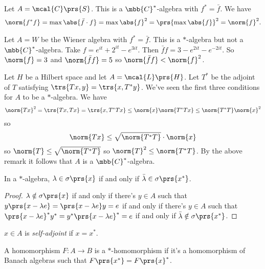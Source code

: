 \documentclass[10pt, twoside]{book}
\begin{document}
\begin{example}
Let $A = \mcal{C}\prs{S}$. This is a $\mbb{C}^*$-algebra with $f^* = \bar{f}$. We have
\begin{align*}
\norm{f^* f} = \max \abs{\bar{f} \cdot f} = \max \abs{f}^2 = \prs{\max \abs{f}}^2 = \norm{f}^2 \text{.}
\end{align*}
\end{example}

\begin{example}
Let $A = W$ be the Wiener algebra with $f^* = \bar{f}$. This is a $*$-algebra but not a $\mbb{C}^*$-algebra. Take $f = e^{it} + 2^{it} - e^{3 it}$. Then $\bar{f} f = 3 - e^{2 it} - e^{-2 it}$. So $\norm{f} = 3$ and $\norm{\bar{f} f} = 5$ so $\norm{\bar{f} f} < \norm{f}^2$.
\end{example}

\begin{example}
Let $H$ be a Hilbert space and let $A =\mcal{L}\prs{H}$. Let $T^*$ be the adjoint of $T$ satisfying $\trs{Tx, y} = \trs{x, T^* y}$. We've seen the first three conditions for $A$ to be a $*$-algebra. We have
\[\norm{Tx}^2 = \trs{Tx, Tx} = \trs{x, T^* T x} \leq \norm{x} \norm{T^* T x} \leq \norm{T^* T} \norm{x}^2\]
so
\[\norm{T x} \leq \sqrt{\norm{T^* T}} \cdot \norm{x}\]
so $\norm{T} \leq \sqrt{\norm{T^* T}}$
so
$\norm{T}^2 \leq \norm{T^* T}$.
By the above remark it follows that $A$ is a $\mbb{C}^*$-algebra.
\end{example}

\begin{proposition}
In a $*$-algebra, $\lambda \in \sigma\prs{x}$ if and only if $\bar{\lambda} \in \sigma\prs{x^*}$.
\end{proposition}

\begin{proof}
$\lambda \notin \sigma\prs{x}$ if and only if there's $y \in A$ such that $y\prs{x-\lambda e} = \prs{x-\lambda e} y = e$ if and only if there's $y \in A$ such that $\prs{x-\lambda e}^* y^*  = y^* \prs{x-\lambda e}^* = e$ if and only if $\bar{\lambda} \notin \sigma\prs{x^*}$.
\end{proof}

\begin{definition}
$x \in A$ is \emph{self-adjoint} if $x = x^*$.
\end{definition}

\begin{definition}[$*$-Homomorphism]
A homomorphism $F \colon A \to B$ is a $*$-homomorphism if it's a homomorphism of Banach algebras such that $F\prs{x^*} = F\prs{x}^*$.
\end{definition}
\end{document}
